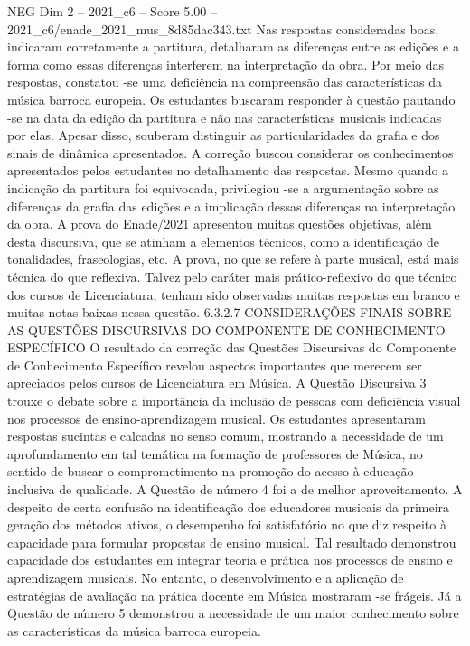 \begin{textsample}{NEG Dim 2 – 2021\_c6 – Score 5.00 – 2021\_c6/enade\_2021\_mus\_8d85dac343.txt}
Nas respostas consideradas boas, indicaram corretamente a partitura, detalharam as diferenças entre as edições e a forma como essas diferenças interferem na interpretação da obra.
Por meio das respostas, constatou -se uma deficiência na compreensão das características da música barroca europeia.
Os estudantes buscaram responder à questão pautando -se na data da edição da partitura e não nas características musicais indicadas por elas.
Apesar disso, souberam distinguir as particularidades da grafia e dos sinais de dinâmica apresentados.
A correção buscou considerar os conhecimentos apresentados pelos estudantes no detalhamento das respostas.
Mesmo quando a indicação da partitura foi equivocada, privilegiou -se a argumentação sobre as diferenças da grafia das edições e a implicação dessas diferenças na interpretação da obra.
A prova do Enade/2021 apresentou muitas questões objetivas, além desta discursiva, que se atinham a elementos técnicos, como a identificação de tonalidades, fraseologias, etc.
A prova, no que se refere à parte musical, está mais técnica do que reflexiva.
Talvez pelo caráter mais prático-reflexivo do que técnico dos cursos de Licenciatura, tenham sido observadas muitas respostas em branco e muitas notas baixas nessa questão. 6.3.2.7 CONSIDERAÇÕES FINAIS SOBRE AS QUESTÕES DISCURSIVAS DO COMPONENTE DE CONHECIMENTO ESPECÍFICO O resultado da correção das Questões Discursivas do Componente de Conhecimento Específico revelou aspectos importantes que merecem ser apreciados pelos cursos de Licenciatura em Música.
A Questão Discursiva 3 trouxe o debate sobre a importância da inclusão de pessoas com deficiência visual nos processos de ensino-aprendizagem musical.
Os estudantes apresentaram respostas sucintas e calcadas no senso comum, mostrando a necessidade de um aprofundamento em tal temática na formação de professores de Música, no sentido de buscar o comprometimento na promoção do acesso à educação inclusiva de qualidade.
A Questão de número 4 foi a de melhor aproveitamento.
A despeito de certa confusão na identificação dos educadores musicais da primeira geração dos métodos ativos, o desempenho foi satisfatório no que diz respeito à capacidade para formular propostas de ensino musical.
Tal resultado demonstrou capacidade dos estudantes em integrar teoria e prática nos processos de ensino e aprendizagem musicais.
No entanto, o desenvolvimento e a aplicação de estratégias de avaliação na prática docente em Música mostraram -se frágeis.
Já a Questão de número 5 demonstrou a necessidade de um maior conhecimento sobre as características da música barroca europeia.

\end{textsample}
